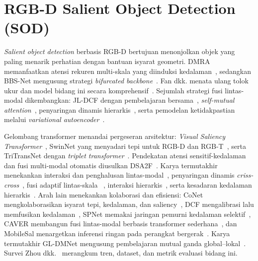\documentclass[11pt,a4paper]{article}
\begin{document}
\section{RGB-D Salient Object Detection (SOD)}
\emph{Salient object detection} berbasis RGB-D bertujuan menonjolkan objek yang
paling menarik perhatian dengan bantuan isyarat geometri. DMRA memanfaatkan
atensi rekuren multi-skala yang diinduksi kedalaman~\cite{piao2019dmra},
sedangkan BBS-Net mengusung strategi \emph{bifurcated backbone}~\cite{fan2020bbsnet}.
Fan dkk. menata ulang tolok ukur dan model bidang ini secara
komprehensif~\cite{fan2020d3net}. Sejumlah strategi fusi lintas-modal
dikembangkan: JL-DCF dengan pembelajaran bersama~\cite{fu2020jldcf},
\emph{self-mutual attention}~\cite{liu2020s2ma}, penyaringan dinamis
hierarkis~\cite{pang2020hdfnet}, serta pemodelan ketidakpastian melalui
\emph{variational autoencoder}~\cite{zhang2020ucnet}.

Gelombang transformer menandai pergeseran arsitektur: \emph{Visual Saliency
Transformer}~\cite{liu2021vst}, SwinNet yang menyadari tepi untuk RGB-D dan
RGB-T~\cite{liu2021swinnet}, serta TriTransNet dengan
\emph{triplet transformer}~\cite{liu2021tritransnet}. Pendekatan atensi
sensitif-kedalaman dan fusi multi-modal otomatis diusulkan
DSA2F~\cite{sun2021dsa2f}. Karya termutakhir menekankan interaksi dan penghalusan
lintas-modal~\cite{cong2022cirnet}, penyaringan dinamis
\emph{criss-cross}~\cite{zhang2022c2dfnet}, fusi adaptif lintas-skala
~\cite{zhou2022ccafnet}, interaksi hierarkis~\cite{chen2023cmhi}, serta kesadaran
kedalaman hierarkis~\cite{wu2023hidanet}. Arah lain menekankan kolaborasi dan
efisiensi: CoNet mengkolaborasikan isyarat tepi, kedalaman, dan
saliency~\cite{ji2020conet}, DCF mengalibrasi lalu memfusikan
kedalaman~\cite{ji2021dcf}, SPNet memakai jaringan pemurni kedalaman
selektif~\cite{zhou2021spnet}, CAVER membangun fusi lintas-modal berbasis
transformer sederhana~\cite{pang2023caver}, dan MobileSal menargetkan inferensi
ringan pada perangkat bergerak~\cite{wu2022mobilesal}. Karya termutakhir GL-DMNet
mengusung pembelajaran mutual ganda global--lokal~\cite{yi2025gldmnet}. Survei Zhou
dkk.~\cite{zhou2021rgbdsurvey} merangkum tren, dataset, dan metrik evaluasi
bidang ini.

\end{document}
